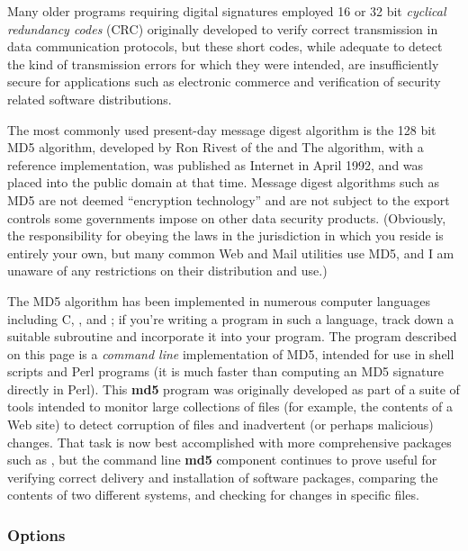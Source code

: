 Many older programs requiring digital signatures employed 16 or 32 bit {\it
cyclical redundancy codes} (CRC) originally developed to verify correct
transmission in data communication protocols, but these short codes, while
adequate to detect the kind of transmission errors for which they were
intended, are insufficiently secure for applications such as electronic
commerce and verification of security related software distributions. 

The most commonly used present-day message digest algorithm is the 128 bit MD5
algorithm, developed by Ron Rivest of the 
 and 
 The algorithm, with a
reference implementation, was published as Internet 
 in April 1992, and
was placed into the public domain at that time. Message digest algorithms such
as MD5 are not deemed ``encryption technology'' and are not subject to the
export controls some governments impose on other data security products.
(Obviously, the responsibility for obeying the laws in the jurisdiction in
which you reside is entirely your own, but many common Web and Mail utilities
use MD5, and I am unaware of any restrictions on their distribution and use.) 

The MD5 algorithm has been implemented in numerous computer languages
including C, 
, and 
; if you're writing a program in such a
language, track down a suitable subroutine and incorporate it into your
program. The program described on this page is a {\it command line}
implementation of MD5, intended for use in shell scripts and Perl programs (it
is much faster than computing an MD5 signature directly in Perl). This {\bf
md5} program was originally developed as part of a suite of tools intended to
monitor large collections of files (for example, the contents of a Web site)
to detect corruption of files and inadvertent (or perhaps malicious) changes.
That task is now best accomplished with more comprehensive packages such as 
, but the
command line {\bf md5} component continues to prove useful for verifying
correct delivery and installation of software packages, comparing the contents
of two different systems, and checking for changes in specific files. 

\subsubsection*{Options}

